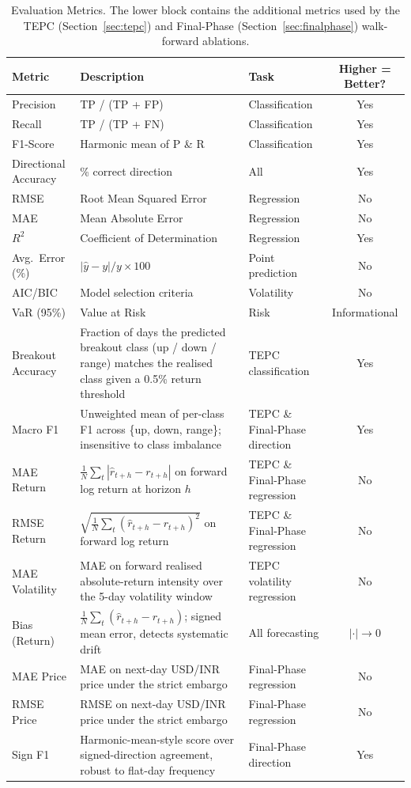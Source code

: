 \documentclass[11pt]{article}
\begin{document}
\begin{table}[t]
\centering
\small
\caption{Evaluation Metrics. The lower block contains the additional metrics used by the TEPC (Section~\ref{sec:tepc}) and Final-Phase (Section~\ref{sec:finalphase}) walk-forward ablations.}
\label{tab:metrics}
\begin{tabularx}{\textwidth}{l X l c}
\toprule
\textbf{Metric} & \textbf{Description} & \textbf{Task} & \textbf{Higher = Better?} \\
\midrule
Precision & TP / (TP + FP) & Classification & Yes \\
Recall & TP / (TP + FN) & Classification & Yes \\
F1-Score & Harmonic mean of P \& R & Classification & Yes \\
Directional Accuracy & \% correct direction & All & Yes \\
RMSE & Root Mean Squared Error & Regression & No \\
MAE & Mean Absolute Error & Regression & No \\
$R^2$ & Coefficient of Determination & Regression & Yes \\
Avg.\ Error (\%) & $|\hat{y} - y| / y \times 100$ & Point prediction & No \\
AIC/BIC & Model selection criteria & Volatility & No \\
VaR (95\%) & Value at Risk & Risk & Informational \\
\midrule
Breakout Accuracy & Fraction of days the predicted breakout class (up / down / range) matches the realised class given a 0.5\% return threshold & TEPC classification & Yes \\
Macro F1 & Unweighted mean of per-class F1 across \{up, down, range\}; insensitive to class imbalance & TEPC \& Final-Phase direction & Yes \\
MAE Return & $\tfrac{1}{N}\sum_t |\hat{r}_{t+h} - r_{t+h}|$ on forward log return at horizon $h$ & TEPC \& Final-Phase regression & No \\
RMSE Return & $\sqrt{\tfrac{1}{N}\sum_t (\hat{r}_{t+h} - r_{t+h})^2}$ on forward log return & TEPC \& Final-Phase regression & No \\
MAE Volatility & MAE on forward realised absolute-return intensity over the 5-day volatility window & TEPC volatility regression & No \\
Bias (Return) & $\tfrac{1}{N}\sum_t (\hat{r}_{t+h} - r_{t+h})$; signed mean error, detects systematic drift & All forecasting & $|\cdot|\!\to\!0$ \\
MAE Price & MAE on next-day USD/INR price under the strict embargo & Final-Phase regression & No \\
RMSE Price & RMSE on next-day USD/INR price under the strict embargo & Final-Phase regression & No \\
Sign F1 & Harmonic-mean-style score over signed-direction agreement, robust to flat-day frequency & Final-Phase direction & Yes \\
\bottomrule
\end{tabularx}
\end{table}
\end{document}
